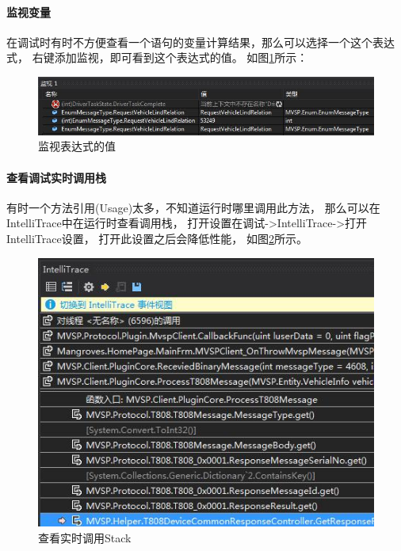 \documentclass{book}
\begin{document}
\paragraph{监视变量}

在调试时有时不方便查看一个语句的变量计算结果，那么可以选择一个这个表达式，
右键添加监视，即可看到这个表达式的值。
如图\ref{fig:ProbeExpressValue}所示：

\begin{figure}[htbp]
	\centering
	\includegraphics[scale=0.6]{ProbeExpressValue.jpg}
	\caption{监视表达式的值}
	\label{fig:ProbeExpressValue}
\end{figure}

\paragraph{查看调试实时调用栈}

有时一个方法引用(Usage)太多，不知道运行时哪里调用此方法，
那么可以在IntelliTrace中在运行时查看调用栈，
打开设置在调试->IntelliTrace->打开IntelliTrace设置，
打开此设置之后会降低性能，
如图\ref{fig:IntelliRuntimeInvokeStack}所示。

\begin{figure}[htbp]
	\centering
	\includegraphics[scale=0.6]{IntelliRuntimeInvokeStack.jpg}
	\caption{查看实时调用Stack}
	\label{fig:IntelliRuntimeInvokeStack}
\end{figure}
\end{document}
